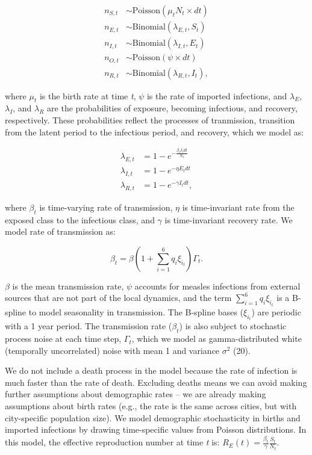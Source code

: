 \documentclass[3p]{elsarticle} %
\begin{document}
\begin{align}
n_{S,t} &\sim \text{Poisson}(\mu_t N_t \times dt) \\
n_{E,t} &\sim \text{Binomial}(\lambda_{E,t}, S_{t}) \\
n_{I,t} &\sim \text{Binomial}(\lambda_{I,t}, E_{t}) \\
n_{O,t} &\sim \text{Poisson}(\psi \times dt) \\
n_{R,t} &\sim \text{Binomial}(\lambda_{R,t}, I_{t}),
\end{align}

\noindent{}where \(\mu_t\) is the birth rate at time \emph{t}, \(\psi\)
is the rate of imported infections, and \(\lambda_E\), \(\lambda_I\),
and \(\lambda_R\) are the probabilities of exposure, becoming
infectious, and recovery, respectively. These probabilities reflect the
processes of tranmission, transition from the latent period to the
infectious period, and recovery, which we model as:

\begin{align}
\lambda_{E,t} &= 1 - e^{-\frac{\beta_t I_t dt}{N_t}} \\
\lambda_{I,t} &= 1 - e^{-\eta E_{t} dt} \\
\lambda_{R,t} &= 1 - e^{-\gamma I_{t} dt},
\end{align}

\noindent{}where \(\beta_t\) is time-varying rate of transmission,
\(\eta\) is time-invariant rate from the exposed class to the infectious
class, and \(\gamma\) is time-invariant recovery rate. We model rate of
transmission as:

\begin{equation}
\beta_t = \beta \left(1 + \sum^6_{i=1} q_i \xi_{i_{t}} \right) \Gamma_t.
\end{equation}

\(\beta\) is the mean transmission rate, \(\psi\) accounts for measles
infections from external sources that are not part of the local
dynamics, and the term \(\sum^6_{i=1} q_i \xi_{i_{t}}\) is a B-spline to
model seasonality in transmission. The B-spline bases (\(\xi_{i_{t}}\))
are periodic with a 1 year period. The transmission rate (\(\beta_t\))
is also subject to stochastic process noise at each time step,
\(\Gamma_t\), which we model as gamma-distributed white (temporally
uncorrelated) noise with mean 1 and variance \(\sigma^2\) (20).

We do not include a death process in the model because the rate of
infection is much faster than the rate of death. Excluding deaths means
we can avoid making further assumptions about demographic rates -- we
are already making assumptions about birth rates (e.g., the rate is the
same across cities, but with city-specific population size). We model
demographic stochasticity in births and imported infections by drawing
time-specific values from Poisson distributions. In this model, the
effective reproduction number at time \emph{t} is:
\(R_E(t) = \frac{\beta_t}{\gamma} \frac{S_t}{N_t}\).
\end{document}
